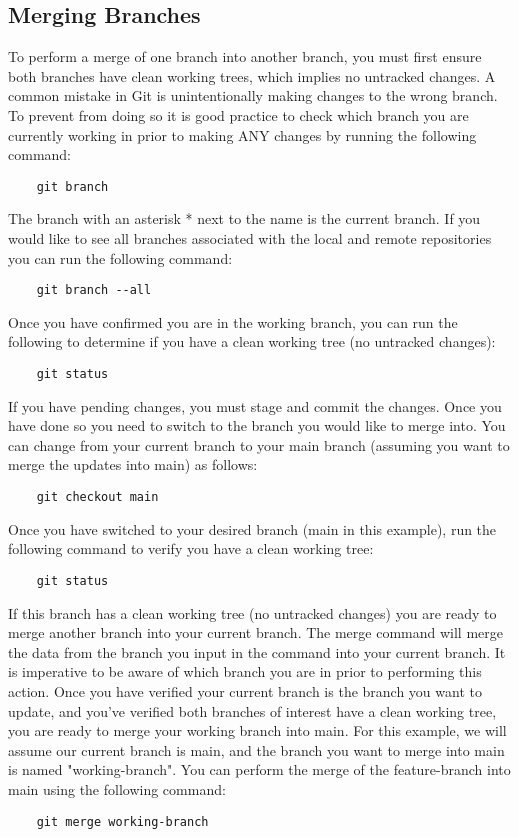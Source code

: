 \documentclass{article}
\begin{document}
\subsection*{Merging Branches}
To perform a merge of one branch into another branch,  you must first ensure both branches have clean working trees, which implies no untracked changes. A common mistake in Git is unintentionally making changes to the wrong branch. To prevent from doing so it is good practice to check which branch you are currently working in prior to making ANY changes by running the following command:
\begin{verbatim}
    git branch
\end{verbatim}
The branch with an asterisk * next to the name is the current branch. If you would like to see all branches associated with the local and remote repositories you can run the following command:
\begin{verbatim}
    git branch --all
\end{verbatim}
Once you have confirmed you are in the working branch, you can run the following to determine if you have a clean working tree (no untracked changes):
\begin{verbatim}
    git status
\end{verbatim}
If you have pending changes, you must stage and commit the changes. Once you have done so you need to switch to the branch you would like to merge into. You can change from your current branch to your main branch (assuming you want to merge the updates into main) as follows:
\begin{verbatim}
    git checkout main
\end{verbatim}
Once you have switched to your desired branch (main in this example), run the following command to verify you have a clean working tree:
\begin{verbatim}
    git status
\end{verbatim}
If this branch has a clean working tree (no untracked changes) you are ready to merge another branch into your current branch. The merge command will merge the data from the branch you input in the command into your current branch. It is imperative to be aware of which branch you are in prior to performing this action. Once you have verified your current branch is the branch you want to update, and you've verified both branches of interest have a clean working tree, you are ready to merge your working branch into main. For this example, we will assume our current branch is main, and the branch you want to merge into main is named "working-branch". You can perform the merge of the feature-branch into main using the following command: 
\begin{verbatim}
    git merge working-branch
\end{verbatim}
\end{document}
